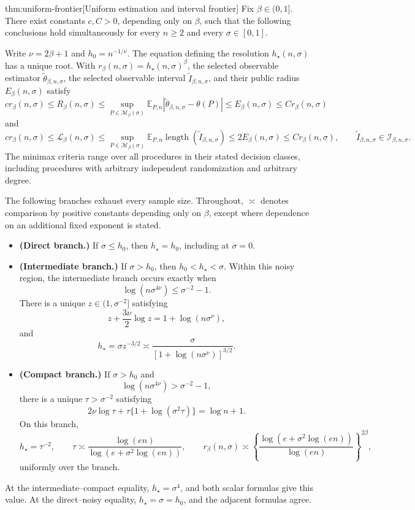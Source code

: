 \documentclass[11pt]{article}
\begin{document}
\begin{theoremv}{thm:uniform-frontier}[Uniform estimation and interval frontier]
Fix \(\beta\in(0,1]\). There exist constants \(c,C>0\), depending only on \(\beta\), such that the following conclusions hold simultaneously for every \(n\ge2\) and every \(\sigma\in[0,1]\).

Write \(\nu=2\beta+1\) and \(h_0=n^{-1/\nu}\). The equation defining the resolution \(h_\star(n,\sigma)\) has a unique root. With \(r_\beta(n,\sigma)=h_\star(n,\sigma)^\beta\), the selected observable estimator \(\widetilde\theta_{\beta,n,\sigma}\), the selected observable interval \(\widetilde I_{\beta,n,\sigma}\), and their public radius \(E_\beta(n,\sigma)\) satisfy
\[
c r_\beta(n,\sigma)
\le R_\beta(n,\sigma)
\le \sup_{P\in\mathcal M_\beta(\sigma)}
\mathbb E_{P,n}
\left|\widetilde\theta_{\beta,n,\sigma}-\theta(P)\right|
\le E_\beta(n,\sigma)
\le C r_\beta(n,\sigma)
\]
and
\[
c r_\beta(n,\sigma)
\le \mathcal L_\beta(n,\sigma)
\le \sup_{P\in\mathcal M_\beta(\sigma)}
\mathbb E_{P,n}
\operatorname{length}(\widetilde I_{\beta,n,\sigma})
\le 2E_\beta(n,\sigma)
\le C r_\beta(n,\sigma),
\qquad
\widetilde I_{\beta,n,\sigma}\in\mathcal I_{\beta,n,\sigma}.
\]
The minimax criteria range over all procedures in their stated decision classes, including procedures with arbitrary independent randomization and arbitrary degree.

The following branches exhaust every sample size. Throughout, \(\asymp\) denotes comparison by positive constants depending only on \(\beta\), except where dependence on an additional fixed exponent is stated.
\begin{itemize}
\item \textbf{(Direct branch.)}
If \(\sigma\le h_0\), then \(h_\star=h_0\), including at \(\sigma=0\).

\item \textbf{(Intermediate branch.)}
If \(\sigma>h_0\), then \(h_0<h_\star<\sigma\). Within this noisy region, the intermediate branch occurs exactly when
\[
\log(n\sigma^{4\nu})\le \sigma^{-2}-1.
\]
There is a unique \(z\in(1,\sigma^{-2}]\) satisfying
\[
z+\frac{3\nu}{2}\log z=1+\log(n\sigma^\nu),
\]
and
\[
h_\star=\sigma z^{-3/2}
\asymp
\frac{\sigma}{[1+\log(n\sigma^\nu)]^{3/2}}.
\]

\item \textbf{(Compact branch.)}
If \(\sigma>h_0\) and
\[
\log(n\sigma^{4\nu})>\sigma^{-2}-1,
\]
there is a unique \(\tau>\sigma^{-2}\) satisfying
\[
2\nu\log\tau+
\tau\{1+\log(\sigma^2\tau)\}
=\log n+1.
\]
On this branch,
\[
h_\star=\tau^{-2},
\qquad
\tau\asymp
\frac{\log(en)}{\log(e+\sigma^2\log(en))},
\qquad
r_\beta(n,\sigma)\asymp
\left\{
\frac{\log(e+\sigma^2\log(en))}{\log(en)}
\right\}^{2\beta},
\]
uniformly over the branch.
\end{itemize}
At the intermediate--compact equality, \(h_\star=\sigma^4\), and both scalar formulas give this value. At the direct--noisy equality, \(h_\star=\sigma=h_0\), and the adjacent formulas agree.


\end{theoremv}
\end{document}
